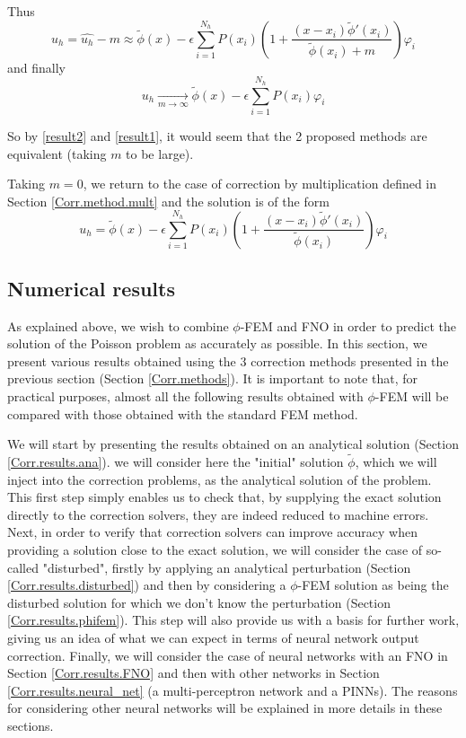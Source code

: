 Thus
\begin{equation*}
	u_h=\hat{u_h}-m\approx\tilde{\phi}(x)-\epsilon\sum_{i=1}^{N_h}P(x_i)\left(1+\frac{(x-x_i)\tilde{\phi}'(x_i)}{\tilde{\phi}(x_i)+m}\right)\varphi_i
\end{equation*}
and finally
\begin{equation}
	u_h\xrightarrow[m\to\infty]{} \tilde{\phi}(x)-\epsilon\sum_{i=1}^{N_h}P(x_i)\varphi_i \label{result1}
\end{equation}

So by \ref{result2} and \ref{result1}, it would seem that the 2 proposed methods are equivalent (taking $m$ to be large).

\begin{Rem}
	Taking $m=0$, we return to the case of correction by multiplication defined in Section \ref{Corr.method.mult} and the solution is of the form
	\begin{equation*}
		u_h=\tilde{\phi}(x)-\epsilon\sum_{i=1}^{N_h}P(x_i)\left(1+\frac{(x-x_i)\tilde{\phi}'(x_i)}{\tilde{\phi}(x_i)}\right)\varphi_i
	\end{equation*}
\end{Rem}

\newpage

\subsection{Numerical results} \label{Corr.results}

As explained above, we wish to combine $\phi$-FEM and FNO in order to predict the solution of the Poisson problem as accurately as possible. In this section, we present various results obtained using the 3 correction methods presented in the previous section (Section \ref{Corr.methods}). It is important to note that, for practical purposes, almost all the following results obtained with $\phi$-FEM will be compared with those obtained with the standard FEM method.

We will start by presenting the results obtained on an analytical solution (Section \ref{Corr.results.ana}). we will consider here the "initial" solution $\tilde{\phi}$, which we will inject into the correction problems, as the analytical solution of the problem. This first step simply enables us to check that, by supplying the exact solution directly to the correction solvers, they are indeed reduced to machine errors. Next, in order to verify that correction solvers can improve accuracy when providing a solution close to the exact solution, we will consider the case of so-called "disturbed", firstly by applying an analytical perturbation (Section \ref{Corr.results.disturbed}) and then by considering a $\phi$-FEM solution as being the disturbed solution for which we don't know the perturbation (Section \ref{Corr.results.phifem}). This step will also provide us with a basis for further work, giving us an idea of what we can expect in terms of neural network output correction. Finally, we will consider the case of neural networks with an FNO in Section \ref{Corr.results.FNO} and then with other networks in Section \ref{Corr.results.neural_net} (a multi-perceptron network and a PINNs). The reasons for considering other neural networks will be explained in more details in these sections.

